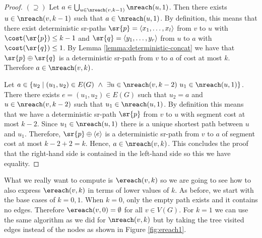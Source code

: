 \begin{proof}
$(\supseteq)$ Let $a \in \bigcup_{u \in \nreach(v, k - 1)} \nreach(u, 1)$. Then
there exists $u \in \nreach(v, k - 1)$ such that $a \in \nreach(u, 1)$. By definition,
this means that there exist deterministic sr-paths $\sr{p} = \langle x_1, \ldots, x_l \rangle$
from $v$ to $u$ with $\cost(\sr{p}) \leq k - 1$ and $\sr{q} = \langle y_1, \ldots, y_r \rangle$
from $u$ to $a$ with $\cost(\sr{q}) \leq 1$. By Lemma 
\ref{lemma:deterministic-concat} we have that $\sr{p} \oplus \sr{q}$ is a
deterministic sr-path from $v$ to $a$ of cost at most $k$. Therefore $a \in \nreach(v, k)$.

Let $a \in \left\{ u_2 \mid (u_1, u_2) \in E(G) \ \wedge \ \exists u \in \nreach(v, k - 2) \ u_1 \in \nreach(u, 1) \right\}$.
There there exists $e = (u_1, u_2) \in E(G)$ such that $u_2 = a$ and $u \in \nreach(v, k - 2)$
such that $u_1 \in \nreach(u, 1)$. By definition this means that we have a
deterministic sr-path $\sr{p}$ from $v$ to $u$ with segment cost at most $k - 2$.
Since $u_1 \in \nreach(u, 1)$ there is a unique shortest path between $u$ and $u_1$.
Therefore, $\sr{p} \oplus \langle e \rangle$ is a deterministic sr-path
from $v$ to $a$ of segment cost at most $k - 2 + 2 = k$. Hence, $a \in \nreach(v, k)$.
This concludes the proof that the right-hand side is contained in the left-hand side
so this we have equality.
\end{proof}

What we really want to compute is $\ereach(v, k)$ so we are going to see how to also
express $\ereach(v, k)$ in terms of lower values of $k$. As before, we start with the base
cases of $k = 0, 1$. When $k = 0$, only the empty path exists and it contains no edges.
Therefore $\ereach(v, 0) = \emptyset$ for all $v \in V(G)$.
For $k = 1$ we can use the same algorithm as we did for $\nreach(v, k)$ but by taking the tree
visited edges instead of the nodes as shown in Figure \ref{fig:ereach1}.

